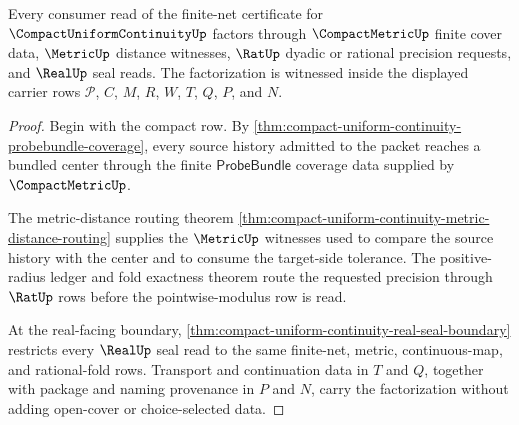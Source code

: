 \begin{theorem}
\label{thm:compact-uniform-continuity-finite-net-factorization}
Every consumer read of the finite-net certificate for $\CompactUniformContinuityUp$ factors through $\CompactMetricUp$ finite cover data, $\MetricUp$ distance witnesses, $\RatUp$ dyadic or rational precision requests, and $\RealUp$ seal reads. The factorization is witnessed inside the displayed carrier rows $\mathcal{P}$, $C$, $M$, $R$, $W$, $T$, $Q$, $P$, and $N$.
\end{theorem}
\begin{proof}
Begin with the compact row. By \autoref{thm:compact-uniform-continuity-probebundle-coverage}, every source history admitted to the packet reaches a bundled center through the finite $\mathsf{ProbeBundle}$ coverage data supplied by $\CompactMetricUp$.

The metric-distance routing theorem \autoref{thm:compact-uniform-continuity-metric-distance-routing} supplies the $\MetricUp$ witnesses used to compare the source history with the center and to consume the target-side tolerance. The positive-radius ledger and fold exactness theorem route the requested precision through $\RatUp$ rows before the pointwise-modulus row is read.

At the real-facing boundary, \autoref{thm:compact-uniform-continuity-real-seal-boundary} restricts every $\RealUp$ seal read to the same finite-net, metric, continuous-map, and rational-fold rows. Transport and continuation data in $T$ and $Q$, together with package and naming provenance in $P$ and $N$, carry the factorization without adding open-cover or choice-selected data.
\end{proof}

